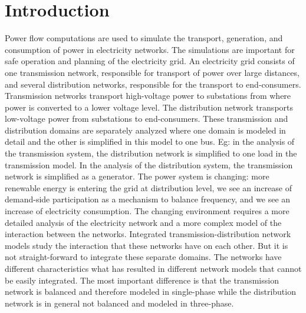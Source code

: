 \documentclass[10pt,journal]{article}
\begin{document}
\section{Introduction}
Power flow computations are used to simulate the transport, generation, and consumption of power in electricity networks. The simulations are important for safe operation and planning of the electricity grid. An electricity grid consists of one transmission network, responsible for transport of power over large distances, and several distribution networks, responsible for the transport to end-consumers. Transmission networks transport high-voltage power to substations from where power is converted to a lower voltage level. The distribution network transports low-voltage power from substations to end-consumers. These transmission and distribution domains are separately analyzed where one domain is modeled in detail and the other is simplified in this model to one bus. Eg: in the analysis of the transmission system, the distribution network is simplified to one load in the transmission model. In the analysis of the distribution system,  the transmission network is simplified as a generator.  \newline\newline
The power system is changing: more renewable energy is entering the grid at distribution level, we see an increase of demand-side participation as a mechanism to balance frequency, and we see an increase of electricity consumption. The changing environment requires a more detailed analysis of the electricity network and a more complex model of the interaction between the networks. Integrated transmission-distribution network models study the interaction that these networks have on each other. But it is not straight-forward to integrate these separate domains. The networks have different characteristics what has resulted in different network models that cannot be easily integrated. The most important difference is that the transmission network is balanced and therefore modeled in single-phase while the distribution network is in general not balanced and modeled in three-phase. 
\end{document}
